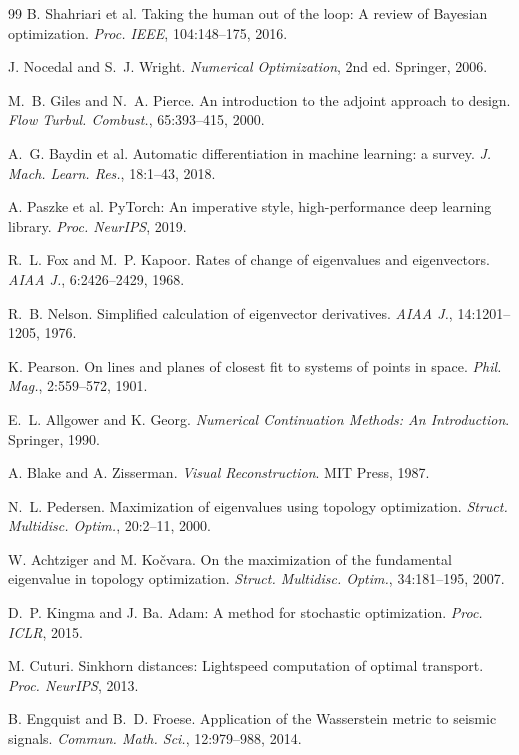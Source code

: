 \documentclass[11pt,a4paper]{article}
\begin{document}
\begin{thebibliography}{99}
 B. Shahriari et al. Taking the human out of the loop: A
review of Bayesian optimization. \textit{Proc. IEEE}, 104:148--175, 2016.

 J. Nocedal and S.~J. Wright. \textit{Numerical
Optimization}, 2nd ed. Springer, 2006.

 M.~B. Giles and N.~A. Pierce. An introduction to the adjoint
approach to design. \textit{Flow Turbul. Combust.}, 65:393--415, 2000.

 A.~G. Baydin et al. Automatic differentiation in machine
learning: a survey. \textit{J. Mach. Learn. Res.}, 18:1--43, 2018.

 A. Paszke et al. PyTorch: An imperative style, high-performance
deep learning library. \textit{Proc. NeurIPS}, 2019.

 R.~L. Fox and M.~P. Kapoor. Rates of change of eigenvalues and
eigenvectors. \textit{AIAA J.}, 6:2426--2429, 1968.

 R.~B. Nelson. Simplified calculation of eigenvector
derivatives. \textit{AIAA J.}, 14:1201--1205, 1976.

 K. Pearson. On lines and planes of closest fit to systems of
points in space. \textit{Phil. Mag.}, 2:559--572, 1901.

 E.~L. Allgower and K. Georg. \textit{Numerical Continuation
Methods: An Introduction}. Springer, 1990.

 A. Blake and A. Zisserman. \textit{Visual Reconstruction}.
MIT Press, 1987.

 N.~L. Pedersen. Maximization of eigenvalues using topology
optimization. \textit{Struct. Multidisc. Optim.}, 20:2--11, 2000.

 W. Achtziger and M. Ko\v{c}vara. On the maximization of
the fundamental eigenvalue in topology optimization. \textit{Struct. Multidisc.
Optim.}, 34:181--195, 2007.

 D.~P. Kingma and J. Ba. Adam: A method for stochastic
optimization. \textit{Proc. ICLR}, 2015.

 M. Cuturi. Sinkhorn distances: Lightspeed computation of
optimal transport. \textit{Proc. NeurIPS}, 2013.

 B. Engquist and B.~D. Froese. Application of the
Wasserstein metric to seismic signals. \textit{Commun. Math. Sci.}, 12:979--988,
2014.


\end{thebibliography}
\end{document}

